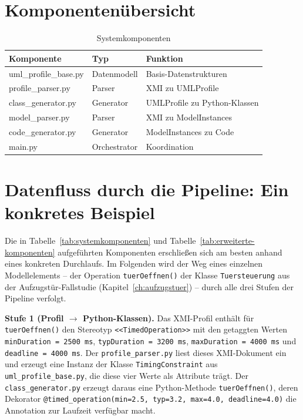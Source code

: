 ﻿\documentclass[a4paper,12pt]{report}
\theoremstyle{definition}
\begin{document}
\section{Komponentenübersicht}

\begin{table}[h]
\centering
\begin{tabular}{@{}llp{5cm}@{}}
\toprule
\textbf{Komponente} & \textbf{Typ} & \textbf{Funktion} \\
\midrule
uml\_profile\_base.py & Datenmodell & Basis-Datenstrukturen \\
profile\_parser.py & Parser & XMI zu UMLProfile \\
class\_generator.py & Generator & UMLProfile zu Python-Klassen \\
model\_parser.py & Parser & XMI zu ModelInstances \\
code\_generator.py & Generator & ModelInstances zu Code \\
main.py & Orchestrator & Koordination \\
\bottomrule
\end{tabular}
\caption{Systemkomponenten}
\label{tab:systemkomponenten}
\label{tab:components}
\end{table}

\section{Datenfluss durch die Pipeline: Ein konkretes Beispiel}
\label{sec:datenfluss-pipeline}

Die in Tabelle~\ref{tab:systemkomponenten} und
Tabelle~\ref{tab:erweiterte-komponenten} aufgeführten Komponenten erschließen
sich am besten anhand eines konkreten Durchlaufs. Im Folgenden wird der Weg
eines einzelnen Modellelements -- der Operation \texttt{tuerOeffnen()} der
Klasse \texttt{Tuersteuerung} aus der Aufzugstür-Fallstudie
(Kapitel~\ref{ch:aufzugstuer}) -- durch alle drei Stufen der Pipeline
verfolgt.

\textbf{Stufe 1 (Profil $\to$ Python-Klassen).} Das XMI-Profil enthält für
\texttt{tuerOeffnen()} den Stereotyp \texttt{<<TimedOperation>>} mit den
getaggten Werten \texttt{minDuration = 2500\,ms},
\texttt{typDuration = 3200\,ms}, \texttt{maxDuration = 4000\,ms} und
\texttt{deadline = 4000\,ms}. Der \texttt{profile\_parser.py} liest dieses
XMI-Dokument ein und erzeugt eine Instanz der Klasse
\texttt{TimingConstraint} aus \texttt{uml\_profile\_base.py}, die diese vier
Werte als Attribute trägt. Der \texttt{class\_generator.py} erzeugt daraus
eine Python-Methode \texttt{tuerOeffnen()}, deren Dekorator
\texttt{@timed\_operation(min=2.5, typ=3.2, max=4.0, deadline=4.0)} die
Annotation zur Laufzeit verfügbar macht.
\end{document}
